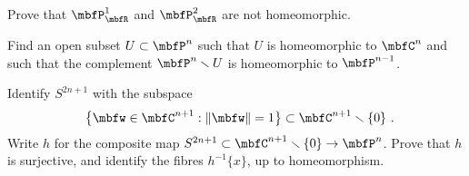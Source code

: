 \documentclass[a4paper,twoside,nols,nobib]{tufte-handout}
\begin{document}
\begin{Problem}
	\noindent
	Prove that $\PP^1_{\RR}$ and $\PP^2_{\RR}$ are not homeomorphic.
\end{Problem}


\begin{Problem}
	\noindent
	Find an open subset $U \subset \PP^n$ such that $U$ is homeomorphic to $\CC^n$ and such that the complement $\PP^n \smallsetminus U$ is homeomorphic to $\PP^{n-1}$.
\end{Problem}


\begin{Problem}
	\noindent
	Identify $S^{2n+1}$ with the subspace
	\[
		\left\{ \mbfw \in \CC^{n+1} : \|\mbfw\| = 1\right\} \subset \CC^{n+1} \smallsetminus \{0\} \period
	\]
	Write $h$ for the composite map $S^{2n+1} \subset \CC^{n+1} \smallsetminus \{0\} \to \PP^n$.
	Prove that $h$ is surjective, and identify the fibres $h^{-1}\{x\}$, up to homeomorphism.
\end{Problem}


\end{document}
